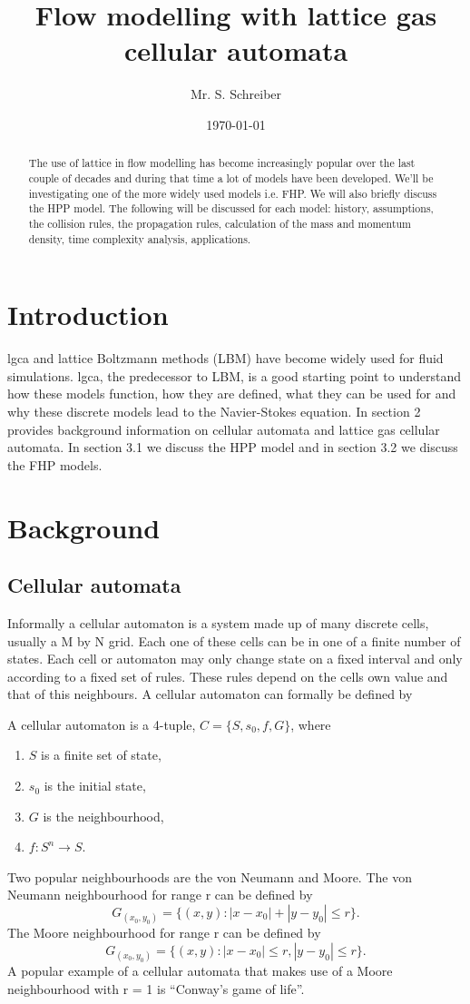 \documentclass[a4paper,10pt]{article}
\author{Mr. S. Schreiber}
\date{\today}
\title{Flow modelling with lattice gas cellular automata}
\newenvironment{definition}[1][Definition]{\begin{trivlist}
\item[\hskip \labelsep {\bfseries #1}]}{\end{trivlist}}
\begin{document}
\maketitle
\begin{abstract}
The use of lattice in flow modelling has become increasingly popular over the last couple of decades and during that time a lot of models have been developed. We'll be investigating one of the more widely used models i.e. FHP. We will also briefly discuss the HPP model. The following will be discussed for each model: history, assumptions, the collision rules, the propagation rules, calculation of the mass and momentum density, time complexity analysis, applications. 
\end{abstract}
\section{Introduction}
\Acrfull{lgca} and lattice Boltzmann methods (LBM) have become widely used for fluid simulations. \Acrfull{lgca}, the predecessor to LBM, is a good starting point to understand how these models function, how they are defined, what they can be used for and why these discrete models lead to the Navier-Stokes equation. In section 2 provides background information on cellular automata and lattice gas cellular automata. In section 3.1 we discuss the HPP model and in section 3.2 we discuss
the FHP models.
\section{Background}
\subsection{Cellular automata}
Informally a cellular automaton is a system made up of many discrete cells, usually a M by N grid. Each one of these cells can be in one of a finite number of states. Each cell or automaton may only change state on a fixed interval and only according to a fixed set of rules. These rules depend on the cells own value and that of this neighbours. A cellular automaton can formally be defined by
\begin{definition}
A cellular automaton is a 4-tuple, $C = \{S,s_{0},f,G\}$, where
\begin{enumerate}
\item $S$ is a finite set of state,
\item $s_{0}$ is the initial state,
\item $G$ is the neighbourhood,
\item $f:S^{n} \rightarrow S$.
\end{enumerate}
\end{definition}
Two popular neighbourhoods are the von Neumann and Moore.
The von Neumann neighbourhood for range r can be defined by \[ G_{(x_{0}, y_{0})} = \{(x, y): \left|x - x_{0} \right| + \left|y - y_{0}\right| \leq r\}.\]
The Moore neighbourhood for range r can be defined by \[ G_{(x_{0}, y_{0})} = \{(x, y): \left|x - x_{0}\right| \leq r, \left|y - y_{0}\right| \leq r \}.\]
A popular example of a cellular automata that makes use of a Moore neighbourhood with r = 1 is ``Conway's game of life''.
\end{document}
